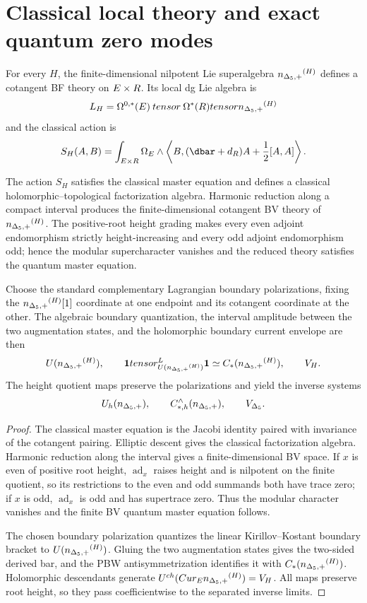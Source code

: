\section{Classical local theory and exact quantum zero modes}
For every $H$, the finite-dimensional nilpotent Lie superalgebra ${n_{\Delta_5,+}}^{(H)}$ defines a cotangent BF theory on $E\times R$.  Its local dg Lie algebra is
\[
 L_H=\Omega^{0,*}(E)\mathbin{tensor}\Omega^*(R)tensor{n_{\Delta_5,+}}^{(H)}
\]
and the classical action is
\[
 S_H(A,B)=\int_{E\times\R}\Omega_E\wedge
 \left\langle B,(\dbar+\dd_{\R})A+\frac12[A,A]\right\rangle .
\]

\begin{theorem}
The action $S_H$ satisfies the classical master equation and defines a classical holomorphic--topological factorization algebra.  Harmonic reduction along a compact interval produces the finite-dimensional cotangent BV theory of ${n_{\Delta_5,+}}^{(H)}$.  The positive-root height grading makes every even adjoint endomorphism strictly height-increasing and every odd adjoint endomorphism odd; hence the modular supercharacter vanishes and the reduced theory satisfies the quantum master equation.

Choose the standard complementary Lagrangian boundary polarizations, fixing the ${n_{\Delta_5,+}}^{(H)}[1]$ coordinate at one endpoint and its cotangent coordinate at the other.  The algebraic boundary quantization, the interval amplitude between the two augmentation states, and the holomorphic boundary current envelope are then
\[
 U({n_{\Delta_5,+}}^{(H)}),\qquad
 \mathbf{1}tensor^{L}_{U({n_{\Delta_5,+}}^{(H)})}\mathbf{1}
 \simeq C_*({n_{\Delta_5,+}}^{(H)}),\qquad V_H.
\]
The height quotient maps preserve the polarizations and yield the inverse systems
\[
 U_h({n_{\Delta_5,+}}),\qquad
 C_{*,h}^{\wedge}({n_{\Delta_5,+}}),\qquad
 V_{\Delta_5}.
\]
\end{theorem}
\begin{proof}
The classical master equation is the Jacobi identity paired with invariance of the cotangent pairing.  Elliptic descent gives the classical factorization algebra.  Harmonic reduction along the interval gives a finite-dimensional BV space.  If $x$ is even of positive root height, $\operatorname{ad}_x$ raises height and is nilpotent on the finite quotient, so its restrictions to the even and odd summands both have trace zero; if $x$ is odd, $\operatorname{ad}_x$ is odd and has supertrace zero.  Thus the modular character vanishes and the finite BV quantum master equation follows.

The chosen boundary polarization quantizes the linear Kirillov--Kostant boundary bracket to $U({n_{\Delta_5,+}}^{(H)})$.  Gluing the two augmentation states gives the two-sided derived bar, and the PBW antisymmetrization identifies it with $C_*({n_{\Delta_5,+}}^{(H)})$.  Holomorphic descendants generate $U^{ch}(Cur_E{n_{\Delta_5,+}}^{(H)})=V_H$.  All maps preserve root height, so they pass coefficientwise to the separated inverse limits.
\end{proof}

